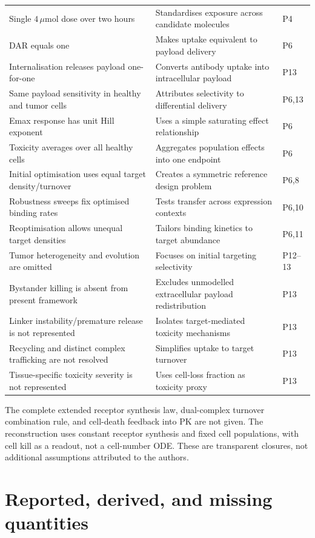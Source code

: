 \documentclass[11pt,a4paper]{article}
\begin{document}
\begin{longtable}{p{.57\linewidth}p{.29\linewidth}p{.08\linewidth}}
Single $4\,\mu$mol dose over two hours & Standardises exposure across candidate molecules & P4\\
DAR equals one & Makes uptake equivalent to payload delivery & P6\\
Internalisation releases payload one-for-one & Converts antibody uptake into intracellular payload & P13\\
Same payload sensitivity in healthy and tumor cells & Attributes selectivity to differential delivery & P6,13\\
Emax response has unit Hill exponent & Uses a simple saturating effect relationship & P6\\
Toxicity averages over all healthy cells & Aggregates population effects into one endpoint & P6\\
Initial optimisation uses equal target density/turnover & Creates a symmetric reference design problem & P6,8\\
Robustness sweeps fix optimised binding rates & Tests transfer across expression contexts & P6,10\\
Reoptimisation allows unequal target densities & Tailors binding kinetics to target abundance & P6,11\\
Tumor heterogeneity and evolution are omitted & Focuses on initial targeting selectivity & P12--13\\
Bystander killing is absent from present framework & Excludes unmodelled extracellular payload redistribution & P13\\
Linker instability/premature release is not represented & Isolates target-mediated toxicity mechanisms & P13\\
Recycling and distinct complex trafficking are not resolved & Simplifies uptake to target turnover & P13\\
Tissue-specific toxicity severity is not represented & Uses cell-loss fraction as toxicity proxy & P13\\
\bottomrule
\end{longtable}
The complete extended receptor synthesis law, dual-complex turnover combination rule, and cell-death feedback into PK are not given. The reconstruction uses constant receptor synthesis and fixed cell populations, with cell kill as a readout, not a cell-number ODE. These are transparent closures, not additional assumptions attributed to the authors.

\section{Reported, derived, and missing quantities}
\end{document}
